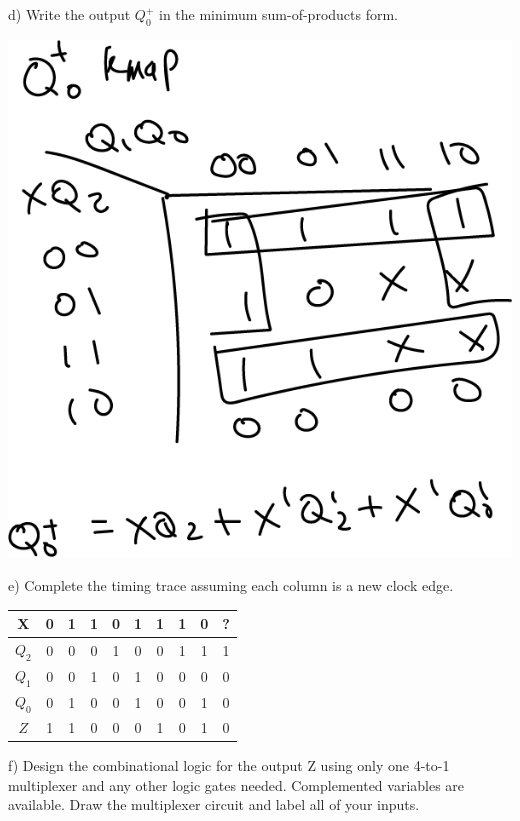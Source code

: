 \documentclass{article}
\begin{document}
    d) Write the output $Q_0^+$ in the minimum sum-of-products form.

    \begin{center}
        \includegraphics[scale=0.4]{Q4_Q0Kmap.png}
    \end{center}

    e) Complete the timing trace assuming each column is a new clock edge.

    \begin{center}
        \begin{tabular} {|c|c|c|c|c|c|c|c|c|c|}
            \hline
            X & 0 & 1 & 1 & 0 & 1 & 1 & 1 & 0 & ? \\
            \hline
            $Q_2$ & 0 & 0 & 0 & 1 & 0 & 0 & 1 & 1 & 1\\
            \hline
            $Q_1$ & 0 & 0 & 1 & 0 & 1 & 0 & 0 & 0 & 0\\
            \hline
            $Q_0$ & 0 & 1 & 0 & 0 & 1 & 0 & 0 & 1 & 0\\
            \hline
            $Z$ & 1 & 1 & 0 & 0 & 0 & 1 & 0 & 1 & 0\\
            \hline
        \end{tabular}
    \end{center}

    f) Design the combinational logic for the output Z using only one 4-to-1 multiplexer 
    and any other logic gates needed. Complemented variables are available. Draw the 
    multiplexer circuit and label all of your inputs.
\end{document}
